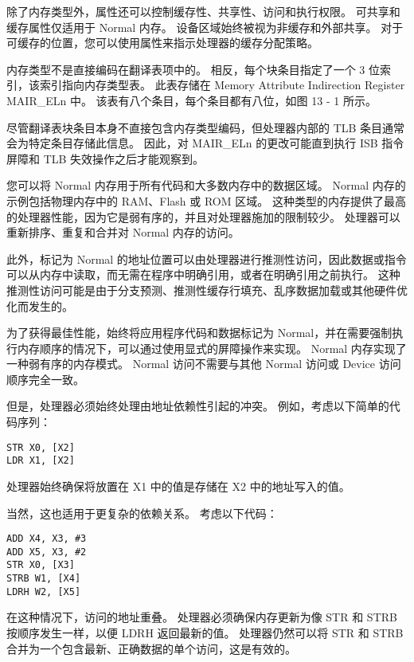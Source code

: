 除了内存类型外，属性还可以控制缓存性、共享性、访问和执行权限。
可共享和缓存属性仅适用于 Normal 内存。
设备区域始终被视为非缓存和外部共享。
对于可缓存的位置，您可以使用属性来指示处理器的缓存分配策略。

内存类型不是直接编码在翻译表项中的。
相反，每个块条目指定了一个 3 位索引，该索引指向内存类型表。
此表存储在 Memory Attribute Indirection Register MAIR\_ELn 中。
该表有八个条目，每个条目都有八位，如图 13 - 1 所示。

尽管翻译表块条目本身不直接包含内存类型编码，但处理器内部的 TLB 条目通常会为特定条目存储此信息。
因此，对 MAIR\_ELn 的更改可能直到执行 ISB 指令屏障和 TLB 失效操作之后才能观察到。



您可以将 Normal 内存用于所有代码和大多数内存中的数据区域。
Normal 内存的示例包括物理内存中的 RAM、Flash 或 ROM 区域。
这种类型的内存提供了最高的处理器性能，因为它是弱有序的，并且对处理器施加的限制较少。
处理器可以重新排序、重复和合并对 Normal 内存的访问。

此外，标记为 Normal 的地址位置可以由处理器进行推测性访问，因此数据或指令可以从内存中读取，而无需在程序中明确引用，或者在明确引用之前执行。
这种推测性访问可能是由于分支预测、推测性缓存行填充、乱序数据加载或其他硬件优化而发生的。

为了获得最佳性能，始终将应用程序代码和数据标记为 Normal，并在需要强制执行内存顺序的情况下，可以通过使用显式的屏障操作来实现。
Normal 内存实现了一种弱有序的内存模式。
Normal 访问不需要与其他 Normal 访问或 Device 访问顺序完全一致。

但是，处理器必须始终处理由地址依赖性引起的冲突。
例如，考虑以下简单的代码序列：

\begin{lstlisting}
STR X0, [X2]
LDR X1, [X2]
\end{lstlisting}

处理器始终确保将放置在 X1 中的值是存储在 X2 中的地址写入的值。

当然，这也适用于更复杂的依赖关系。
考虑以下代码：

\begin{lstlisting}
ADD X4, X3, #3
ADD X5, X3, #2
STR X0, [X3]
STRB W1, [X4]
LDRH W2, [X5]
\end{lstlisting}

在这种情况下，访问的地址重叠。
处理器必须确保内存更新为像 STR 和 STRB 按顺序发生一样，以便 LDRH 返回最新的值。
处理器仍然可以将 STR 和 STRB 合并为一个包含最新、正确数据的单个访问，这是有效的。

